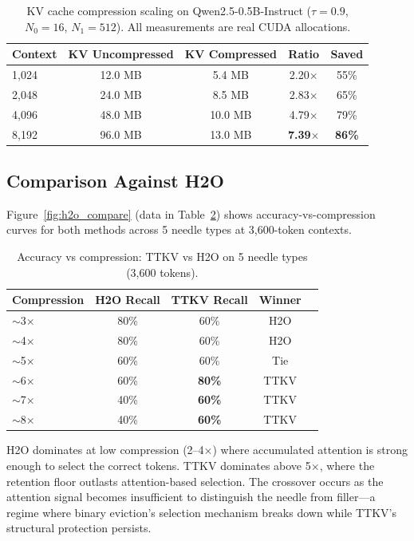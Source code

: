 \documentclass[11pt]{article}
\begin{document}
\begin{table}[ht]
\centering
\caption{KV cache compression scaling on Qwen2.5-0.5B-Instruct ($\tau{=}0.9$, $N_0{=}16$, $N_1{=}512$). All measurements are real CUDA allocations.}
\label{tab:scaling}
\begin{tabular}{lcccc}
\toprule
\textbf{Context} & \textbf{KV Uncompressed} & \textbf{KV Compressed} & \textbf{Ratio} & \textbf{Saved} \\
\midrule
1,024 & 12.0 MB & 5.4 MB & 2.20$\times$ & 55\% \\
2,048 & 24.0 MB & 8.5 MB & 2.83$\times$ & 65\% \\
4,096 & 48.0 MB & 10.0 MB & 4.79$\times$ & 79\% \\
8,192 & 96.0 MB & 13.0 MB & \textbf{7.39$\times$} & \textbf{86\%} \\
\bottomrule
\end{tabular}
\end{table}

\subsection{Comparison Against H2O}

Figure~\ref{fig:h2o_compare} (data in Table~\ref{tab:h2o_compare}) shows accuracy-vs-compression curves for both methods across 5 needle types at 3,600-token contexts.

\begin{table}[ht]
\centering
\caption{Accuracy vs compression: TTKV vs H2O on 5 needle types (3,600 tokens).}
\label{tab:h2o_compare}
\begin{tabular}{lcccc}
\toprule
\textbf{Compression} & \textbf{H2O Recall} & \textbf{TTKV Recall} & \textbf{Winner} \\
\midrule
$\sim$3$\times$ & 80\% & 60\% & H2O \\
$\sim$4$\times$ & 80\% & 60\% & H2O \\
$\sim$5$\times$ & 60\% & 60\% & Tie \\
$\sim$6$\times$ & 60\% & \textbf{80\%} & TTKV \\
$\sim$7$\times$ & 40\% & \textbf{60\%} & TTKV \\
$\sim$8$\times$ & 40\% & \textbf{60\%} & TTKV \\
\bottomrule
\end{tabular}
\end{table}

H2O dominates at low compression (2--4$\times$) where accumulated attention is strong enough to select the correct tokens. TTKV dominates above 5$\times$, where the retention floor outlasts attention-based selection. The crossover occurs as the attention signal becomes insufficient to distinguish the needle from filler---a regime where binary eviction's selection mechanism breaks down while TTKV's structural protection persists.
\end{document}
